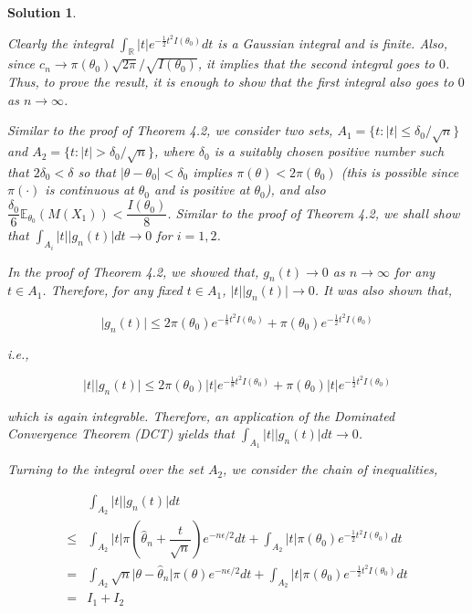 \documentclass[12pt]{article}
\theoremstyle{problemstyle}
\newtheorem*{solution*}{Solution}
\newcommand{\E}{\mathbb{E}}
\newcommand{\R}{\mathbb{R}}
\begin{document}
\begin{solution*}
\begin{enumerate}
        Clearly the integral $\int_\R \vert t \vert e^{-\frac{1}{2}t^2 I(\theta_0)} dt$ is a Gaussian integral and is finite. Also, since $c_n \rightarrow \pi(\theta_0) \sqrt{2\pi}/\sqrt{I(\theta_0)}$, it implies that the second integral goes to $0$. Thus, to prove the result, it is enough to show that the first integral also goes to $0$ as $n \rightarrow \infty$.

        
        Similar to the proof of Theorem 4.2, we consider two sets, $A_1 = \{ t : \vert t \vert \leq \delta_0 / \sqrt{n} \}$ and $A_2 = \{ t : \vert t \vert > \delta_0 / \sqrt{n} \}$, where $\delta_0$ is a suitably chosen positive number such that $2\delta_0 < \delta$ so that $\vert \theta - \theta_0 \vert < \delta_0$ implies $\pi(\theta) < 2 \pi(\theta_0)$ (this is possible since $\pi(\cdot)$ is continuous at $\theta_0$ and is positive at $\theta_0$), and also $\dfrac{\delta_0}{6} \E_{\theta_0}(M(X_1)) < \dfrac{I(\theta_0)}{8}$. Similar to the proof of Theorem 4.2, we shall show that $\int_{A_i} \vert t \vert \vert g_n(t) \vert dt \rightarrow 0$ for $i = 1, 2$. 
        
        In the proof of Theorem 4.2, we showed that, $g_n(t) \rightarrow 0$ as $n \rightarrow \infty$ for any $t \in A_1$. Therefore, for any fixed $t \in A_1$, $\vert t \vert \vert g_n(t) \vert \rightarrow 0$. It was also shown that, 

        $$
        \vert g_n(t)\vert \leq 2\pi(\theta_0) e^{-\frac{1}{8}t^2 I(\theta_0)} + \pi(\theta_0) e^{-\frac{1}{2}t^2 I(\theta_0)}
        $$

        i.e.,

        $$
        \vert t\vert \vert g_n(t)\vert \leq 2\pi(\theta_0) \vert t \vert e^{-\frac{1}{8}t^2 I(\theta_0)} + \pi(\theta_0) \vert t \vert e^{-\frac{1}{2}t^2 I(\theta_0)}
        $$

        which is again integrable. Therefore, an application of the Dominated Convergence Theorem (DCT) yields that $\int_{A_1} \vert t \vert \vert g_n(t) \vert dt \rightarrow 0$.

        Turning to the integral over the set $A_2$, we consider the chain of inequalities,

        \begin{align*}
            & \int_{A_2} \vert t \vert \vert g_n(t) \vert dt \\
            \leq & \int_{A_2} \vert t \vert \pi\left( \widehat{\theta}_n + \dfrac{t}{\sqrt{n}} \right) e^{-n\epsilon/2} dt + \int_{A_2} \vert t \vert \pi(\theta_0) e^{-\frac{1}{2}t^2 I(\theta_0)} dt\\
            = & \int_{A_2} \sqrt{n}\vert \theta - \widehat{\theta}_n \vert \pi(\theta) e^{-n\epsilon/2} dt + \int_{A_2} \vert t \vert \pi(\theta_0) e^{-\frac{1}{2}t^2 I(\theta_0)} dt\\
            = & I_1 + I_2 
        \end{align*}


\end{enumerate}
\end{solution*}
\end{document}
